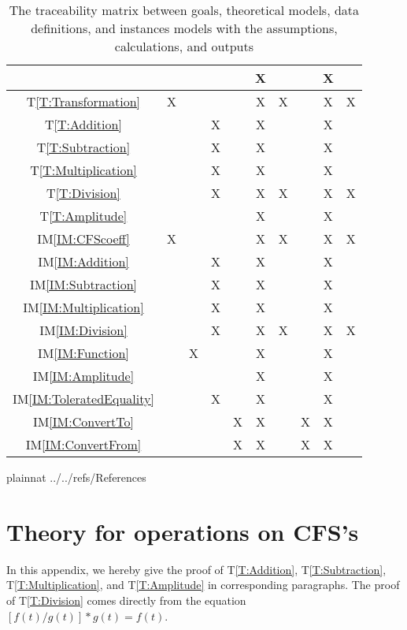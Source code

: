 \documentclass[12pt]{article}
\newcommand{\tref}[1]{T\ref{#1}}
\newcommand{\iref}[1]{IM\ref{#1}}
\begin{document}
\begin{table}
\begin{tabular}{|c|c|c|c|c|c|c|c|c|c|}
		& & & & &X& & &X& \\\hline
		\tref{T:Transformation}
		&X& & & &X&X& &X&X\\\hline
		\tref{T:Addition}
		& & &X& &X& & &X& \\\hline
		\tref{T:Subtraction}
		& & &X& &X& & &X& \\\hline
		\tref{T:Multiplication}
		& & &X& &X& & &X& \\\hline
		\tref{T:Division}
		& & &X& &X&X& &X&X\\\hline
		\tref{T:Amplitude}
		& & & & &X& & &X& \\\hline
		\iref{IM:CFScoeff}
		&X& & & &X&X& &X&X\\\hline
		\iref{IM:Addition}
		& & &X& &X& & &X& \\\hline
		\iref{IM:Subtraction}
		& & &X& &X& & &X& \\\hline
		\iref{IM:Multiplication}
		& & &X& &X& & &X& \\\hline
		\iref{IM:Division}
		& & &X& &X&X& &X&X\\\hline
		\iref{IM:Function}
		& &X& & &X& & &X& \\\hline
		\iref{IM:Amplitude}
		& & & & &X& & &X& \\\hline
		\iref{IM:ToleratedEquality}
		& & &X& &X& & &X& \\\hline
		\iref{IM:ConvertTo}
		& & & &X&X& &X&X& \\\hline
		\iref{IM:ConvertFrom}
		& & & &X&X& &X&X& \\\hline		
	\end{tabular}
	\caption{The traceability matrix between goals, theoretical models, data definitions, and instances models with the assumptions, calculations, and outputs}
	\label{Table:Traceability}
\end{table} 
\newpage

 {plainnat}
 {../../refs/References}

\newpage
\appendix

\section{Theory for operations on CFS's}\label{Appendix:Operations}
In this appendix, we hereby give the proof of  \tref{T:Addition}, \tref{T:Subtraction}, \tref{T:Multiplication}, and
\tref{T:Amplitude} in corresponding paragraphs. The proof of \tref{T:Division} comes directly from the equation $[f(t)/g(t)]*g(t)=f(t)$.
\end{document}
